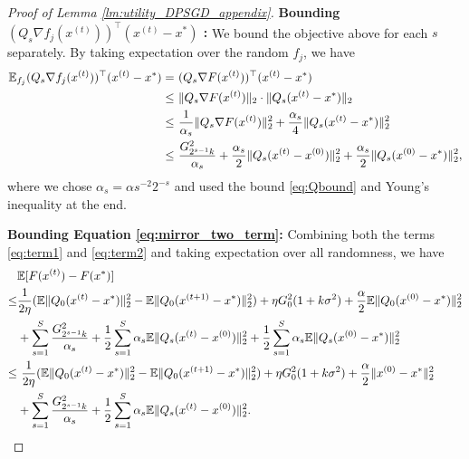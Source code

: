 \begin{proof}[Proof of Lemma \ref{lm:utility_DPSGD_appendix}]
{\bf  Bounding $(Q_s\nabla f_j(x^{(t)}))^\top (x^{(t)}-x^*)$ :}
We bound the objective above for each $s$ separately. 
By taking expectation over the random $f_j$, we have
\begin{align}
\mathbb{E}_{f_j}(Q_{s}\nabla f_{j}(x^{(t)}))^{\top}(x^{(t)}-x^{*}) = &~ (Q_{s}\nabla F(x^{(t)}))^{\top}(x^{(t)}-x^{*}) \nonumber\\
\leq & ~ \|Q_{s}\nabla F(x^{(t)})\|_2
            \cdot \|Q_s(x^{(t)}-x^{*})\|_2 \nonumber \\
\leq &~ \frac{1}{\alpha_{s}}\|Q_{s}\nabla F(x^{(t)})\|_2^{2} + 
            \frac{\alpha_{s}}{4}\|Q_{s}(x^{(t)}-x^{*})\|_2^{2} \nonumber \\
\leq &~ \frac{G_{2^{s-1}k}^{2}}{\alpha_{s}} + 
            \frac{\alpha_{s}}{2}\|Q_{s}(x^{(t)}-x^{(0)})\|_2^{2} +
            \frac{\alpha_{s}}{2}\|Q_{s}(x^{(0)}-x^{*})\|_2^{2} \label{eq:term2},
\end{align}
where we chose $\alpha_{s}=\alpha s^{-2} 2^{-s}$ and used the bound \eqref{eq:Qbound} and Young's inequality at the end.

\medskip

{\bf Bounding Equation \eqref{eq:mirror_two_term}:} Combining both the terms \eqref{eq:term1} and \eqref{eq:term2} and taking expectation over all randomness, we have
\begin{align*}
&\mathbb{E} [F(x^{(t)})- F(x^{*})] \\
\leq & \frac{1}{2\eta}(
    \mathbb{E}\|Q_{0}(x^{(t)}-x^{*})\|_2^{2} - 
    \mathbb{E}\|Q_{0}(x^{(t+1)}-x^{*})\|_2^{2}) +
    \eta G_{0}^{2}(1+k\sigma^{2})+\frac{\alpha}{2}\mathbb{E}\|Q_{0}(x^{(0)}-x^{*})\|_2^{2}\\
 & +\sum_{s=1}^{S}\frac{G_{2^{s-1}k}^{2}}{\alpha_{s}} + 
    \frac{1}{2}\sum_{s=1}^{S}\alpha_{s}\mathbb{E}\|Q_{s}(x^{(t)}-x^{(0)})\|_2^{2} + 
    \frac{1}{2}\sum_{s=1}^{S}\alpha_s\mathbb{E}\|Q_{s}(x^{(0)}-x^{*})\|_2^{2}\\
\leq &~ \frac{1}{2\eta}(
    \mathbb{E}\|Q_{0}(x^{(t)}-x^{*})\|_2^{2} - 
    \mathbb{E}\|Q_{0}(x^{(t+1)}-x^{*})\|_2^{2}) +
    \eta G_{0}^{2}(1+k\sigma^{2}) + 
    \frac{\alpha}{2}\|x^{(0)}-x^{*}\|_2^{2}\\
 & +\sum_{s=1}^S\frac{G_{2^{s-1}k}^{2}}{\alpha_{s}} + 
    \frac{1}{2}\sum_{s=1}^S\alpha_{s}\mathbb{E}\|Q_{s}(x^{(t)}-x^{(0)})\|_2^{2}.
\end{align*}


\end{proof}
